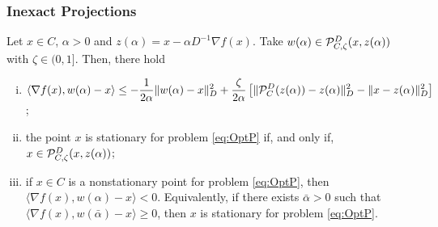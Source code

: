 \begin{frame}[t]\frametitle{Inexact Projections}
  \begin{lemma}[2.18]
    Let $x \in C$, $\alpha > 0$ and  $z(\alpha) = x-\alpha D^{-1} \nabla f(x)$. Take $w(\alpha) \in  {\cal P}_{C,\zeta}^{D}(x, z(\alpha))$ with $\zeta\in (0, 1]$. Then, there hold
    \begin{enumerate}[(i)]
      \item {\small $\displaystyle \langle \nabla f(x), w(\alpha) - x\rangle \leq -\frac{1}{2\alpha} \|w(\alpha) -x\|_{D}^2 +   \frac{\zeta}{2\alpha} \left[\| {\cal P}_{C}^{D}(z(\alpha))-z(\alpha)\|_{D}^2 - \|x-z(\alpha)\|_{D}^2\right]$;}

      \item the point $x$ is stationary for problem \eqref{eq:OptP} if, and only if, $x \in {\cal P}_{C,\zeta}^{D}(x, z(\alpha))$;

      \item if  $x \in C$ is a nonstationary point for problem \eqref{eq:OptP}, then $\Big\langle \nabla f(x), w(\alpha) - x \Big\rangle < 0$. Equivalently, if there exists ${\bar \alpha}>0$ such that $\Big\langle \nabla f(x), w({\bar \alpha}) - x \Big\rangle \geq 0$, then $x$ is stationary for problem \eqref{eq:OptP}.
    \end{enumerate}
  \end{lemma}
\end{frame}